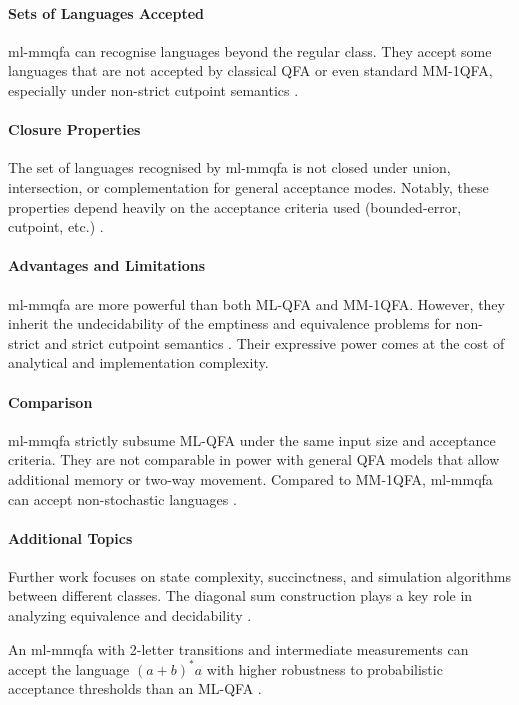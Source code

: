\paragraph{Sets of Languages Accepted}
\gls{ml-mmqfa} can recognise languages beyond the regular class. They accept some languages that are not accepted by classical QFA or even standard MM-1QFA, especially under non-strict cutpoint semantics \cite{qiu2009hierarchy, lin2012equivalence}.

\paragraph{Closure Properties}
The set of languages recognised by \gls{ml-mmqfa} is not closed under union, intersection, or complementation for general acceptance modes. Notably, these properties depend heavily on the acceptance criteria used (bounded-error, cutpoint, etc.) \cite{qiu2009hierarchy}.

\paragraph{Advantages and Limitations}
\gls{ml-mmqfa} are more powerful than both ML-QFA and MM-1QFA. However, they inherit the undecidability of the emptiness and equivalence problems for non-strict and strict cutpoint semantics \cite{qiu2008decidability, lin2012equivalence}. Their expressive power comes at the cost of analytical and implementation complexity.

\paragraph{Comparison} 
\gls{ml-mmqfa} strictly subsume ML-QFA under the same input size and acceptance criteria. They are not comparable in power with general QFA models that allow additional memory or two-way movement. Compared to MM-1QFA, \gls{ml-mmqfa} can accept non-stochastic languages \cite{qiu2009hierarchy}.

\paragraph{Additional Topics}
Further work focuses on state complexity, succinctness, and simulation algorithms between different classes. The diagonal sum construction plays a key role in analyzing equivalence and decidability \cite{lin2012equivalence}.

\begin{example}
An \gls{ml-mmqfa} with 2-letter transitions and intermediate measurements can accept the language $(a+b)^*a$ with higher robustness to probabilistic acceptance thresholds than an ML-QFA \cite{belovs2007multi}.
\end{example}


